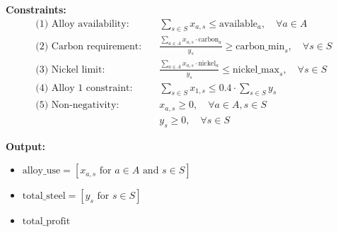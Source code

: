 \documentclass{article}
\begin{document}
\textbf{Constraints:}
\begin{align*}
\text{(1) Alloy availability:} \quad & \sum_{s \in S} x_{a,s} \leq \text{available}_a, \quad \forall a \in A \\
\text{(2) Carbon requirement:} \quad & \frac{\sum_{a \in A} x_{a,s} \cdot \text{carbon}_{a}}{y_s} \geq \text{carbon\_min}_{s}, \quad \forall s \in S \\
\text{(3) Nickel limit:} \quad & \frac{\sum_{a \in A} x_{a,s} \cdot \text{nickel}_{a}}{y_s} \leq \text{nickel\_max}_{s}, \quad \forall s \in S \\
\text{(4) Alloy 1 constraint:} \quad & \sum_{s \in S} x_{1,s} \leq 0.4 \cdot \sum_{s \in S} y_s \\
\text{(5) Non-negativity:} \quad & x_{a,s} \geq 0, \quad \forall a \in A, s \in S \\
& y_s \geq 0, \quad \forall s \in S
\end{align*}

\textbf{Output:}
\begin{itemize}
    \item \( \text{alloy\_use} = \left[ x_{a,s} \text{ for } a \in A \text{ and } s \in S \right] \)
    \item \( \text{total\_steel} = \left[ y_s \text{ for } s \in S \right] \)
    \item \( \text{total\_profit} \)
\end{itemize}
\end{document}
